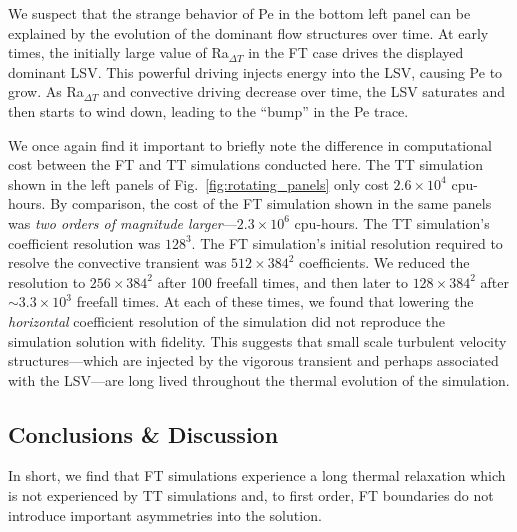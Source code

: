 We suspect that the strange behavior of Pe in the bottom left panel can be explained by the evolution of the dominant flow structures over time.
At early times, the initially large value of Ra$_{\Delta T}$ in the FT case drives the displayed dominant LSV.
This powerful driving injects energy into the LSV, causing Pe to grow.
As Ra$_{\Delta T}$ and convective driving decrease over time, the LSV saturates and then starts to wind down, leading to the ``bump'' in the Pe trace.

We once again find it important to briefly note the difference in computational cost between the FT and TT simulations conducted here.
The TT simulation shown in the left panels of Fig.~\ref{fig:rotating_panels} only cost $2.6 \times 10^4$ cpu-hours.
By comparison, the cost of the FT simulation shown in the same panels was \emph{two orders of magnitude larger}---$2.3 \times 10^6$ cpu-hours.
The TT simulation's coefficient resolution was $128^3$.
The FT simulation's initial resolution required to resolve the convective transient was $512\times384^2$ coefficients.
We reduced the resolution to $256\times384^2$ after 100 freefall times, and then later to $128\times384^2$ after $\sim3.3 \times 10^3$ freefall times.
At each of these times, we found that lowering the \emph{horizontal} coefficient resolution of the simulation did not reproduce the simulation solution with fidelity.
This suggests that small scale turbulent velocity structures---which are injected by the vigorous transient and perhaps associated with the LSV---are long lived throughout the thermal evolution of the simulation.





\subsection{Conclusions \& Discussion}
\label{sec:ft20_discussion}
In short, we find that FT simulations experience a long thermal relaxation which is not experienced by TT simulations and, to first order, FT boundaries do not introduce important asymmetries into the solution.

